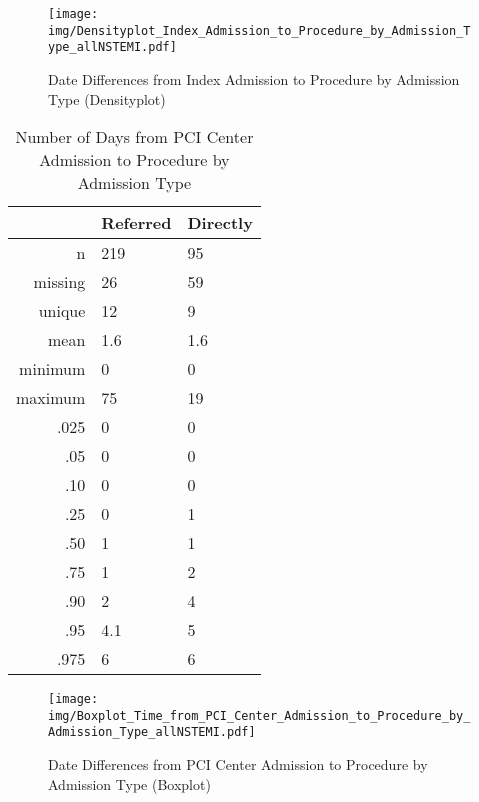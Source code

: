 \documentclass[presentation,xcolor=pdftex,dvipsnames,table,11pt]{beamer}
\begin{document}
\begin{tiny}
\begin{frame}
\begin{figure}
  \centering
  \caption{Date Differences from Index Admission to Procedure by Admission Type (Densityplot)}
  \label{Density: Date Differences from Index Admission to Procedure by Admission Type}
\texttt{[image: img/Densityplot\_Index\_Admission\_to\_Procedure\_by\_Admission\_Type\_allNSTEMI.pdf]}\end{figure}
\end{frame}





\begin{table}[ht]
\centering
\begin{tabular}{rll}
  \toprule
 & Referred & Directly \\ 
  \midrule
n & 219 & 95 \\ 
  missing & 26 & 59 \\ 
  unique & 12 & 9 \\ 
  mean & 1.6 & 1.6 \\ 
  minimum & 0 & 0 \\ 
  maximum & 75 & 19 \\ 
  .025 & 0 & 0 \\ 
  .05 & 0 & 0 \\ 
  .10 & 0 & 0 \\ 
  .25 & 0 & 1 \\ 
  .50 & 1 & 1 \\ 
  .75 & 1 & 2 \\ 
  .90 & 2 & 4 \\ 
  .95 & 4.1 & 5 \\ 
  .975 & 6 & 6 \\ 
   \bottomrule
\end{tabular}
\caption{Number of Days from PCI Center Admission to Procedure by Admission Type} 
\end{table}
\begin{frame}
\begin{figure}
  \centering
  \caption{Date Differences from PCI Center Admission to Procedure by Admission Type (Boxplot)}
  \label{Boxplot: Date Differences from PCI Center Admission to Procedure by Admission Type}
\texttt{[image: img/Boxplot\_Time\_from\_PCI\_Center\_Admission\_to\_Procedure\_by\_Admission\_Type\_allNSTEMI.pdf]}\end{figure}
\end{frame}



\end{tiny}
\end{document}
